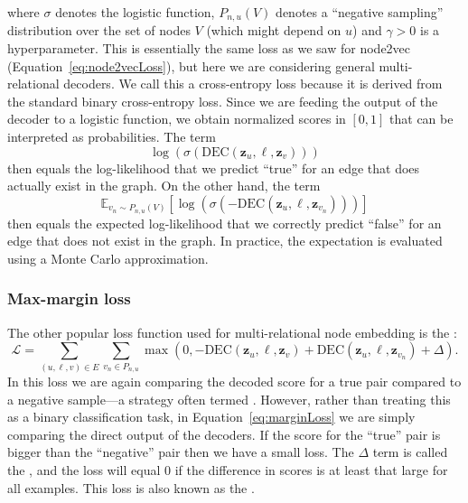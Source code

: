 where $\sigma$ denotes the logistic function, $P_{n,u}(V)$ denotes a ``negative sampling'' distribution over the set of nodes $V$ (which might depend on $u$) and $\gamma > 0$ is a hyperparameter. This is essentially the same loss as we saw for node2vec (Equation~\eqref{eq:node2vecLoss}), but here we are considering general multi-relational decoders.
We call this a cross-entropy loss because it is derived from the standard binary cross-entropy loss. Since we are feeding the output of the decoder to a logistic function, we obtain normalized scores in $[0,1]$ that can be interpreted as probabilities. The term
\begin{equation}\label{eq:logLikelihood}
    \log(\sigma(\text{DEC}(\mathbf{z}_u, \ell, \mathbf{z}_v)))
\end{equation}
then equals the log-likelihood that we predict ``true'' for an edge that does actually exist in the graph. On the other hand, the term
\begin{equation}\label{eq:negativeLogLikelihood}
    \mathbb{E}_{v_n\sim P_{n,u}(V)}[\log(\sigma(-\text{DEC}(\mathbf{z}_u, \ell, \mathbf{z}_{v_n})))]
\end{equation}
then equals the expected log-likelihood that we correctly predict ``false'' for an edge that does not exist in the graph. In practice, the expectation is evaluated using a Monte Carlo approximation.

\subsubsection{Max-margin loss}
The other popular loss function used for multi-relational node embedding is the :
\begin{equation}\label{eq:marginLoss}
    \mathcal{L} = \sum_{(u,\ell,v)\in E} \sum_{v_n\in P_{n,u}} \max(0, -\text{DEC}(\mathbf{z}_u, \ell, \mathbf{z}_v) + \text{DEC}(\mathbf{z}_u, \ell, \mathbf{z}_{v_n}) + \Delta).
\end{equation}
In this loss we are again comparing the decoded score for a true pair compared to a negative sample---a strategy often termed . However, rather than treating this as a binary classification task, in Equation~\eqref{eq:marginLoss} we are simply comparing the direct output of the decoders. If the score for the ``true'' pair is bigger than the ``negative'' pair then we have a small loss. The $\Delta$ term is called the , and the loss will equal 0 if the difference in scores is at least that large for all examples. This loss is also known as the .

